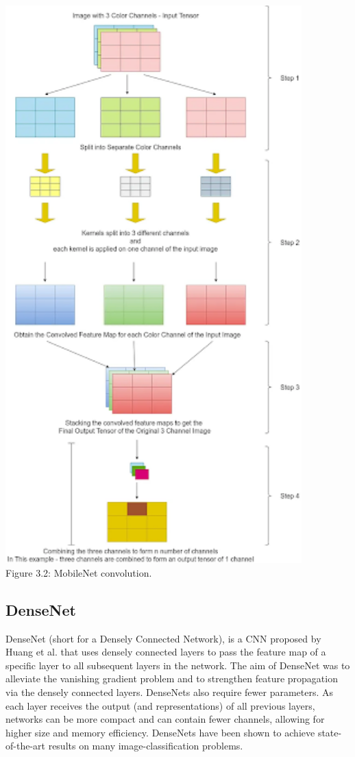    








\begin{center}
   \includegraphics[width=4.5in]{images/3.2.png} 
   \\\fontsize{11pt}{24pt} Figure 3.2: MobileNet convolution.
\end{center}



 


\subsection{DenseNet}
DenseNet (short for a Densely Connected Network), is a CNN proposed by Huang et al.  \cite{21} that uses densely connected layers to pass the feature map of a specific layer to all subsequent layers in the network. The aim of DenseNet was to alleviate the vanishing gradient problem and to strengthen feature propagation via the densely connected layers. DenseNets also require fewer parameters. As each layer receives the output (and representations) of all previous layers, networks can be more compact and can contain fewer channels, allowing for higher size and memory efficiency. DenseNets have been shown to achieve state-of-the-art results on many image-classification problems. 


